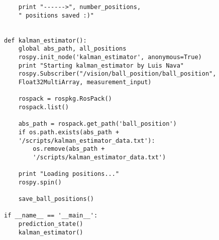 \begin{lstlisting}
	print "------>", number_positions, 
	" positions saved :)" 


def kalman_estimator():
	global abs_path, all_positions
	rospy.init_node('kalman_estimator', anonymous=True)
	print "Starting kalman_estimator by Luis Nava"
	rospy.Subscriber("/vision/ball_position/ball_position", 
	Float32MultiArray, measurement_input)

	rospack = rospkg.RosPack()
	rospack.list()

	abs_path = rospack.get_path('ball_position')
	if os.path.exists(abs_path + 
	'/scripts/kalman_estimator_data.txt'):
		os.remove(abs_path + 
		'/scripts/kalman_estimator_data.txt')

	print "Loading positions..."
	rospy.spin()

	save_ball_positions()
	
if __name__ == '__main__':
	prediction_state()
	kalman_estimator()

\end{lstlisting}